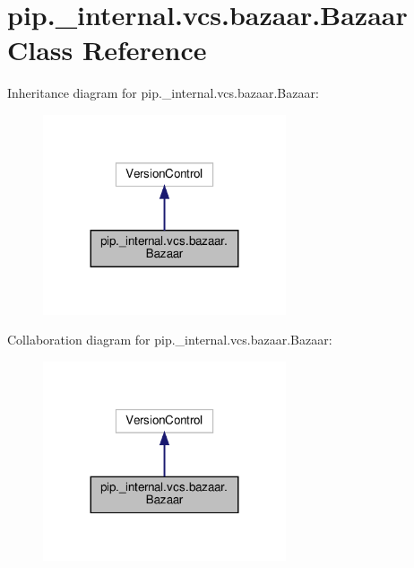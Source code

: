 \hypertarget{classpip_1_1__internal_1_1vcs_1_1bazaar_1_1Bazaar}{}\section{pip.\+\_\+internal.\+vcs.\+bazaar.\+Bazaar Class Reference}
\label{classpip_1_1__internal_1_1vcs_1_1bazaar_1_1Bazaar}


Inheritance diagram for pip.\+\_\+internal.\+vcs.\+bazaar.\+Bazaar\+:
\nopagebreak
\begin{figure}[H]
\begin{center}
\leavevmode
\includegraphics[width=203pt]{classpip_1_1__internal_1_1vcs_1_1bazaar_1_1Bazaar__inherit__graph}
\end{center}
\end{figure}


Collaboration diagram for pip.\+\_\+internal.\+vcs.\+bazaar.\+Bazaar\+:
\nopagebreak
\begin{figure}[H]
\begin{center}
\leavevmode
\includegraphics[width=203pt]{classpip_1_1__internal_1_1vcs_1_1bazaar_1_1Bazaar__coll__graph}
\end{center}
\end{figure}
